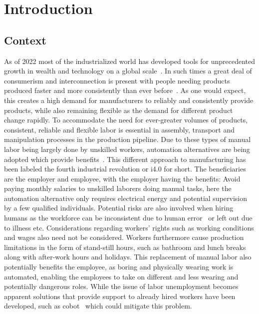 \chapter{Introduction}\label{ch:intro}

\section{Context}\label{sec:intro-context}

As of 2022 most of the industrialized world has developed tools for unprecedented growth in wealth and technology on a global scale~\cite[Chapter 4]{technology-and-inequalities}. In such times a great deal of consumerism and interconnection is present with people needing products produced faster and more consistently than ever before~\cite[Chapter 4]{technology-and-inequalities}. 
As one would expect, this creates a high demand for manufacturers to reliably and consistently provide products, while also remaining flexible as the demand for different product change rapidly. 
To accommodate the need for ever-greater volumes of products, consistent, reliable and flexible labor is essential in assembly, transport and manipulation processes in the production pipeline. Due to these types of manual labor being largely done by unskilled workers, automation alternatives are being adopted which provide benefits~\cite[Chapter 4]{technology-and-inequalities}. This different approach to manufacturing has been labeled the fourth industrial revolution or i4.0 for short.
The beneficiaries are the employer and employee, with the employer having the benefits: Avoid paying monthly salaries to unskilled laborers doing manual tasks, here the automation alternative only requires electrical energy and potential supervision by a few qualified individuals. Potential risks are also involved when hiring humans as the workforce can be inconsistent due to human error~\cite{analysis-and-control-of-human-error} or left out due to illness etc. Considerations regarding workers' rights such as working conditions and wages also need not be considered. Workers furthermore cause production limitations in the form of stand-still hours, such as bathroom and lunch breaks along with after-work hours and holidays.
This replacement of manual labor also potentially benefits the employee, as boring and physically wearing work is automated, enabling the employees to take on different and less wearing and potentially dangerous roles. While the issue of labor unemployment becomes apparent solutions that provide support to already hired workers have been developed, such as \gls{cobot}~\cite{cobots-and-the-benefits-of-their-implementation-in-intelligent-manufacturing} which could mitigate this problem. \medskip

